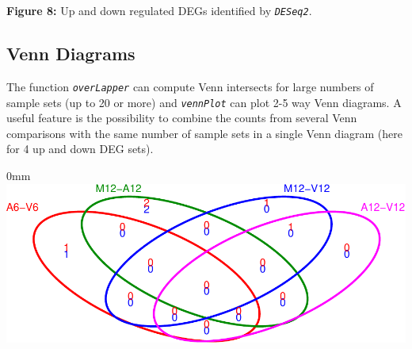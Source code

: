 \documentclass[14pt,]{article}
\newcommand{\hlnum}[1]{\textcolor[rgb]{0.816,0.125,0.439}{#1}}%
\newcommand{\hlstr}[1]{\textcolor[rgb]{0.251,0.627,0.251}{#1}}%
\newcommand{\hlopt}[1]{\textcolor[rgb]{0,0,0}{#1}}%
\newcommand{\hlstd}[1]{\textcolor[rgb]{0.251,0.251,0.251}{#1}}%
\newcommand{\hlkwc}[1]{\textcolor[rgb]{0.251,0.251,0.251}{#1}}%
\newcommand{\hlkwd}[1]{\textcolor[rgb]{0.878,0.439,0.125}{#1}}%
\newenvironment{Shaded}{\begin{myshaded}}{\end{myshaded}}
\newcommand{\KeywordTok}[1]{\hlkwd{#1}}
\newcommand{\DataTypeTok}[1]{\hlkwc{#1}}
\newcommand{\DecValTok}[1]{\hlnum{#1}}
\newcommand{\StringTok}[1]{\hlstr{#1}}
\newcommand{\OperatorTok}[1]{\hlopt{#1}}
\newcommand{\NormalTok}[1]{\hlstd{#1}}
\begin{document}
\textbf{Figure 8:} Up and down regulated DEGs identified by \emph{\texttt{DESeq2}}.

\hypertarget{venn-diagrams}{%
\subsection{Venn Diagrams}\label{venn-diagrams}}

The function \emph{\texttt{overLapper}} can compute Venn intersects for large numbers of sample sets (up to 20 or more) and \emph{\texttt{vennPlot}} can plot 2-5 way Venn diagrams. A useful feature is the possibility to combine the counts from several Venn comparisons with the same number of sample sets in a single Venn diagram (here for 4 up and down DEG sets).

\begin{Shaded}
\end{Shaded}

\begin{adjustwidth}{\fltoffset}{0mm}
\includegraphics{systemPipeR_files/figure-latex/vennplot-1} \end{adjustwidth}
\end{document}
